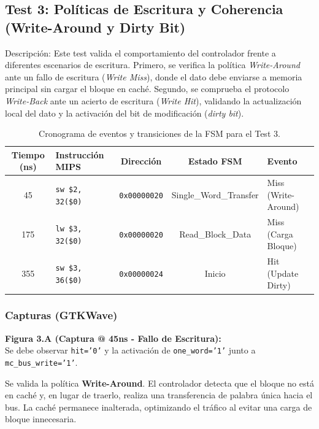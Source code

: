 \documentclass[12pt,a4paper]{article}
\begin{document}
\newpage

\subsection{Test 3: Políticas de Escritura y Coherencia (Write-Around y Dirty Bit)}

Descripción: Este test valida el comportamiento del controlador frente a diferentes escenarios de escritura. Primero, se verifica la política \textit{Write-Around} ante un fallo de escritura (\textit{Write Miss}), donde el dato debe enviarse a memoria principal sin cargar el bloque en caché. Segundo, se comprueba el protocolo \textit{Write-Back} ante un acierto de escritura (\textit{Write Hit}), validando la actualización local del dato y la activación del bit de modificación (\textit{dirty bit}).

\begin{table}[H]
\centering
\small
\renewcommand{\arraystretch}{1.2}
\begin{tabular}{|c|l|c|c|l|}
\hline
\rowcolor[HTML]{EFEFEF} 
\textbf{Tiempo (ns)} & \textbf{Instrucción MIPS} & \textbf{Dirección} & \textbf{Estado FSM} & \textbf{Evento} \\ \hline
45  & \texttt{sw \$2, 32(\$0)}   & \texttt{0x00000020} & Single\_Word\_Transfer & Miss (Write-Around) \\ \hline
175 & \texttt{lw \$3, 32(\$0)}   & \texttt{0x00000020} & Read\_Block\_Data      & Miss (Carga Bloque) \\ \hline
355 & \texttt{sw \$3, 36(\$0)}   & \texttt{0x00000024} & Inicio                 & Hit (Update Dirty)  \\ \hline
\end{tabular}
\caption{Cronograma de eventos y transiciones de la FSM para el Test 3.}
\end{table}

\subsubsection{ Capturas (GTKWave)}


\textbf{Figura 3.A (Captura @ 45ns - Fallo de Escritura):} \\
Se debe observar \texttt{hit='0'} y la activación de \texttt{one\_word='1'} junto a \texttt{mc\_bus\_write='1'}. 

Se valida la política \textbf{Write-Around}. El controlador detecta que el bloque no está en caché y, en lugar de traerlo, realiza una transferencia de palabra única hacia el bus. La caché permanece inalterada, optimizando el tráfico al evitar una carga de bloque innecesaria.
\end{document}
